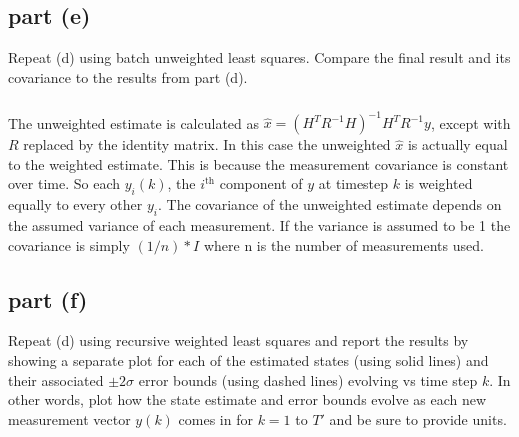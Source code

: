 \documentclass[11pt]{article}
\begin{document}
\subsection*{part (e)}
Repeat (d) using batch unweighted least squares. Compare the final result and its covariance to the results from part (d).

\subparagraph*{}
The unweighted estimate is calculated as $\hat{x}=(H^TR^{-1}H)^{-1}H^TR^{-1}y$, except with $R$ replaced by the identity matrix. In this case the unweighted $\hat{x}$ is actually equal to the weighted estimate. This is because the measurement covariance is constant over time. So each $y_i(k)$, the $i^\text{th}$ component of $y$ at timestep $k$ is weighted equally to every other $y_i$. The covariance of the unweighted estimate depends on the assumed variance of each measurement. If the variance is assumed to be 1 the covariance is simply $(1/n)*I$ where n is the number of measurements used.

\subsection*{part (f)}
Repeat (d) using recursive weighted least squares and report the results by showing a separate plot for each of the estimated states (using solid lines) and their associated $\pm2\sigma$ error bounds (using dashed lines) evolving vs time step $k$. In other words, plot how the state estimate and error bounds evolve as each new measurement vector $y(k)$ comes in for $k=1$ to $T'$ and be sure to provide units.
\end{document}
